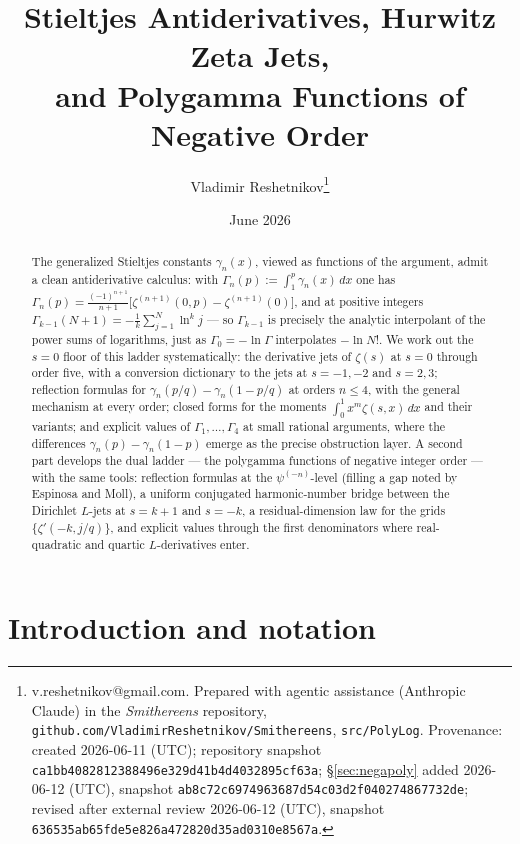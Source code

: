 \documentclass[11pt]{article}
\title{Stieltjes Antiderivatives, Hurwitz Zeta Jets,\\
and Polygamma Functions of Negative Order}
\author{Vladimir Reshetnikov\thanks{%
v.reshetnikov@gmail.com. Prepared with agentic assistance (Anthropic Claude) in the
\emph{Smithereens} repository,
\texttt{github.com/VladimirReshetnikov/Smithereens}, \texttt{src/PolyLog}.
Provenance: created 2026-06-11 (UTC); repository snapshot
\texttt{ca1bb4082812388496e329d41b4d4032895cf63a}; \S\ref{sec:negapoly}
added 2026-06-12 (UTC), snapshot
\texttt{ab8c72c6974963687d54c03d2f040274867732de}; revised after external
review 2026-06-12 (UTC), snapshot
\texttt{636535ab65fde5e826a472820d35ad0310e8567a}.}}
\date{June 2026}
\theoremstyle{remark}
\begin{document}
\maketitle

\begin{abstract}
The generalized Stieltjes constants $\gamma_n(x)$, viewed as functions of the
argument, admit a clean antiderivative calculus: with
$\Gamma_{\!n}(p):=\int_1^p\gamma_n(x)\,dx$ one has
$\Gamma_{\!n}(p)=\frac{(-1)^{n+1}}{n+1}\bigl[\zeta^{(n+1)}(0,p)-\zeta^{(n+1)}(0)\bigr]$,
and at positive integers $\Gamma_{\!k-1}(N{+}1)=-\frac1k\sum_{j=1}^{N}\ln^k j$ —
so $\Gamma_{\!k-1}$ is precisely the analytic interpolant of the power sums of
logarithms, just as $\Gamma_{\!0}=-\ln\Gamma$ interpolates $-\ln N!$. We work
out the $s=0$ floor of this ladder systematically: the derivative jets of
$\zeta(s)$ at $s=0$ through order five, with a conversion dictionary to the
jets at $s=-1,-2$ and $s=2,3$; reflection formulas for
$\gamma_n(p/q)-\gamma_n(1-p/q)$ at orders $n\le4$, with the general mechanism
at every order; closed forms for the moments $\int_0^1x^m\zeta(s,x)\,dx$ and
their variants; and explicit values of $\Gamma_{\!1},\dots,\Gamma_{\!4}$ at
small rational arguments, where the differences $\gamma_n(p)-\gamma_n(1-p)$
emerge as the precise obstruction layer. A second part develops the dual
ladder — the polygamma functions of negative integer order — with the same
tools: reflection formulas at the $\psi^{(-n)}$-level (filling a gap noted by
Espinosa and Moll), a uniform conjugated harmonic-number bridge between the
Dirichlet $L$-jets at $s=k{+}1$ and $s=-k$, a residual-dimension law for the
grids $\{\zeta'(-k,j/q)\}$, and explicit values through the first
denominators where real-quadratic and quartic $L$-derivatives enter.
\end{abstract}

\section{Introduction and notation}\label{sec:intro}
\end{document}
